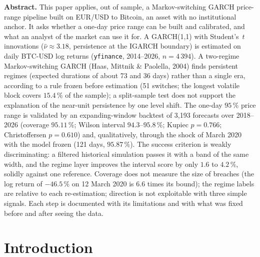 \documentclass[12pt,a4paper]{article}
\begin{document}
\newpage

\begin{center}
	\begin{mdframed}[backgroundcolor=fxlight,linecolor=fxnavy,linewidth=1pt,innerleftmargin=12pt,innerrightmargin=12pt,innertopmargin=10pt,innerbottommargin=10pt]
		\textbf{Abstract.}
		This paper applies, out of sample, a Markov-switching GARCH price-range pipeline built on EUR/USD to Bitcoin, an asset with no institutional anchor. It asks whether a one-day price range can be built and calibrated, and what an analyst of the market can use it for. A GARCH(1,1) with Student's~$t$ innovations ($\hat\nu\approx3.18$, persistence at the IGARCH boundary) is estimated on daily BTC-USD log returns (\texttt{yfinance}, 2014--2026, $n=4\,394$). A two-regime Markov-switching GARCH (Haas, Mittnik \& Paolella, 2004) finds persistent regimes (expected durations of about 73 and 36 days) rather than a single era, according to a rule frozen before estimation (51 switches; the longest volatile block covers $15.4\,\%$ of the sample); a split-sample test does not support the explanation of the near-unit persistence by one level shift. The one-day $95\,\%$ price range is validated by an expanding-window backtest of 3,193 forecasts over 2018--2026 (coverage $95.11\,\%$; Wilson interval $94.3$--$95.8\,\%$; Kupiec $p=0.766$; Christoffersen $p=0.610$) and, qualitatively, through the shock of March 2020 with the model frozen (121 days, $95.87\,\%$). The success criterion is weakly discriminating: a filtered historical simulation passes it with a band of the same width, and the regime layer improves the interval score by only $1.6$ to $4.2\,\%$, solidly against one reference. Coverage does not measure the size of breaches (the log return of $-46.5\,\%$ on 12 March 2020 is $6.6$ times its bound); the regime labels are relative to each re-estimation; direction is not exploitable with three simple signals. Each step is documented with its limitations and with what was fixed before and after seeing the data.
	\end{mdframed}
\end{center}

\newpage
\tableofcontents
\newpage

\section{Introduction}
\label{sec:intro}
\end{document}
